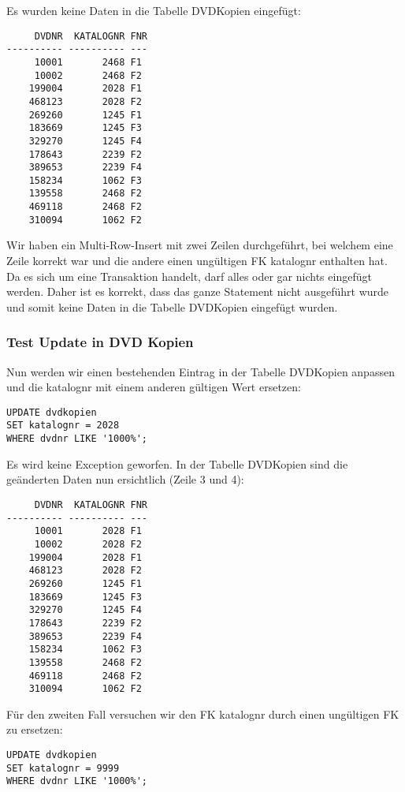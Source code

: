 \documentclass[11pt,a4paper,parskip=half]{scrartcl}
\begin{document}
Es wurden keine Daten in die Tabelle DVDKopien eingefügt:

\begin{lstlisting}
     DVDNR  KATALOGNR FNR
---------- ---------- ---
     10001       2468 F1  
     10002       2468 F2
    199004       2028 F1  
    468123       2028 F2  
    269260       1245 F1  
    183669       1245 F3  
    329270       1245 F4  
    178643       2239 F2  
    389653       2239 F4  
    158234       1062 F3  
    139558       2468 F2  
    469118       2468 F2  
    310094       1062 F2  
\end{lstlisting}

Wir haben ein Multi-Row-Insert mit zwei Zeilen durchgeführt, bei welchem eine Zeile korrekt war und die andere einen ungültigen FK katalognr enthalten hat. Da es sich um eine Transaktion handelt, darf alles oder gar nichts eingefügt werden. Daher ist es korrekt, dass das ganze Statement nicht ausgeführt wurde und somit keine Daten in die Tabelle DVDKopien eingefügt wurden.

\subsubsection{Test Update in DVD Kopien}
Nun werden wir einen bestehenden Eintrag in der Tabelle DVDKopien anpassen und die katalognr mit einem anderen gültigen Wert ersetzen:

\begin{lstlisting}
UPDATE dvdkopien
SET katalognr = 2028
WHERE dvdnr LIKE '1000%';
\end{lstlisting}

Es wird keine Exception geworfen. In der Tabelle DVDKopien sind die geänderten Daten nun ersichtlich (Zeile 3 und 4):

\begin{lstlisting}
     DVDNR  KATALOGNR FNR
---------- ---------- ---
     10001       2028 F1  
     10002       2028 F2  
    199004       2028 F1  
    468123       2028 F2  
    269260       1245 F1  
    183669       1245 F3  
    329270       1245 F4  
    178643       2239 F2  
    389653       2239 F4  
    158234       1062 F3  
    139558       2468 F2  
    469118       2468 F2  
    310094       1062 F2  
\end{lstlisting}

Für den zweiten Fall versuchen wir den FK katalognr durch einen ungültigen FK zu ersetzen:

\begin{lstlisting}
UPDATE dvdkopien
SET katalognr = 9999
WHERE dvdnr LIKE '1000%';
\end{lstlisting}
\end{document}
